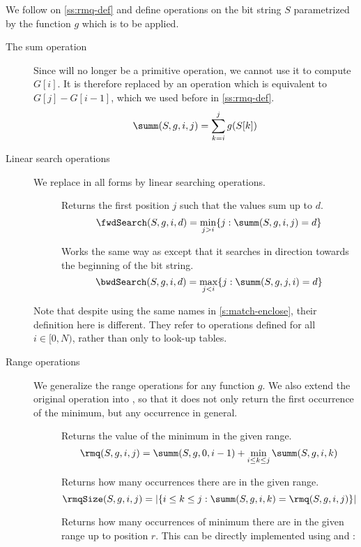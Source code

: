 We follow on \ref{ss:rmq-def} and define operations on the bit string $S$ parametrized by the function $g$ which is to be applied.
\begin{description}
	\item[The sum operation]
	Since \rank{} will no longer be a primitive operation, we cannot use it to compute $G[i]$.
	It is therefore replaced by an operation \summ{} which is equivalent to $G[j] - G[i - 1]$, which we used before in \ref{ss:rmq-def}.
	$$\summ(S, g, i, j) = \sum_{k=i}^j g(S[k])$$
	
	\item[Linear search operations]
	We replace \select{} in all forms by linear searching operations.
	\begin{description}
		\item[\fwdSearch{}]
		Returns the first position $j$ such that the values sum up to $d$.
		$$\fwdSearch(S, g, i, d) = \min_{j > i} \{j : \summ(S, g, i, j) = d\}$$
		
		\item[\bwdSearch{}]
		Works the same way as \fwdSearch{} except that it searches in direction towards the beginning of the bit string.
		$$\bwdSearch(S, g, i, d) = \max_{j < i} \{j : \summ(S, g, j, i) = d\}$$
	\end{description}
	
	Note that despite using the same names in \ref{s:match-enclose}, their definition here is different.
	They refer to operations defined for all $i \in [0, N)$, rather than only to look-up tables. 
	
	\item[Range operations]
	We generalize the range operations for any function $g$.
	We also extend the original operation \rmqi{} into \rmqSelect{}, so that it does not only return the first occurrence of the minimum, but any occurrence in general.
	
	\begin{description}
		\item[\rmq{}]
		Returns the value of the minimum in the given range.
		$$\rmq(S, g, i, j) = \summ(S, g, 0, i - 1) + \min_{i \le k \le j} \summ(S, g, i, k)$$

		\item[\rmqSize{}]
		Returns how many occurrences there are in the given range.
		$$\rmqSize(S, g, i, j) = | \{ i \le k \le j : \summ(S, g, i, k) = \rmq(S, g, i, j) \} | $$
		
		\item[\rmqRank{}]
		Returns how many occurrences of minimum there are in the given range up to position $r$.
		This can be directly implemented using \rmq{} and \rmqSize{}:
		\begin{algorithm}
		\begin{algorithmic}
				\State {}
			\Else
				\State {}
			\EndIf
		\EndFunction
		\end{algorithmic}
		\end{algorithm}
		

\end{description}
\end{description}
